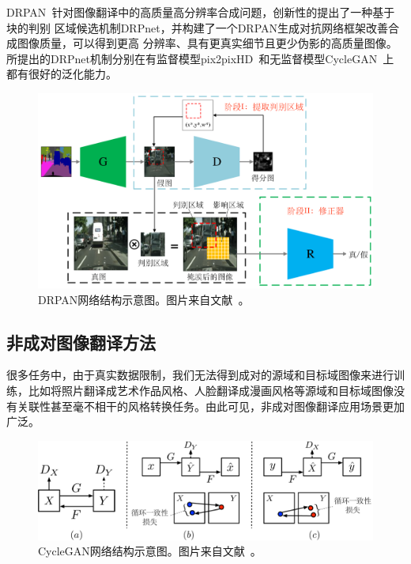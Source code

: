 
DRPAN~\cite{wang2019discriminative}针对图像翻译中的高质量高分辨率合成问题，创新性的提出了一种基于块的判别 区域候选机制DRPnet，并构建了一个DRPAN生成对抗网络框架改善合成图像质量，可以得到更高 分辨率、具有更真实细节且更少伪影的高质量图像。所提出的DRPnet机制分别在有监督模型pix2pixHD~\cite{wang2018high}和无监督模型CycleGAN~\cite{zhu2017unpaired}上都有很好的泛化能力。

\begin{figure}[ht]
    \centering
	\includegraphics[width=\textwidth]{figures/DRPAN.pdf}
	\caption{DRPAN网络结构示意图。图片来自文献~\cite{wang2019discriminative}。}
	\label{fig:drpan}
\end{figure}

\subsection{非成对图像翻译方法}
很多任务中，由于真实数据限制，我们无法得到成对的源域和目标域图像来进行训练，比如将照片翻译成艺术作品风格、人脸翻译成漫画风格等源域和目标域图像没有关联性甚至毫不相干的风格转换任务。由此可见，非成对图像翻译应用场景更加广泛。

\begin{figure}[ht]
    \centering
	\includegraphics[width=\textwidth]{figures/cyclegan.pdf}
	\caption{CycleGAN网络结构示意图。图片来自文献~\cite{zhu2017unpaired}。}
	\label{fig:cyclegan}
\end{figure}

